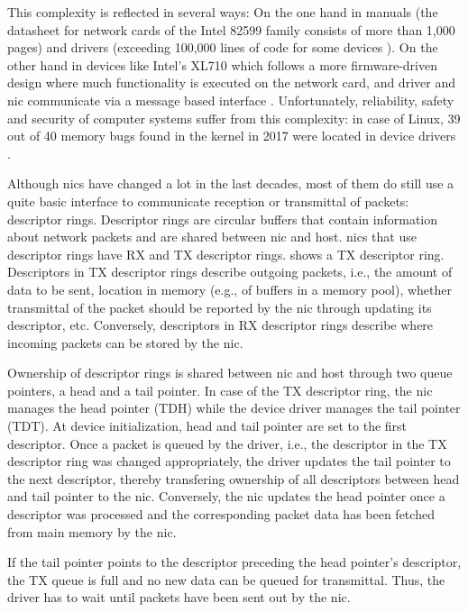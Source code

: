 This complexity is reflected in several ways: On the one hand in manuals (the
datasheet for network cards of the Intel 82599 family \cite{intel2016datasheet}
consists of more than 1,000 pages) and drivers (exceeding 100,000 lines of code
for some devices \cite{emmerich2019case}). On the other hand in devices like
Intel's XL710 which follows a more firmware-driven design where much
functionality is executed on the network card, and driver and \ac{nic}
communicate via a message based interface \cite{emmerich2019user}.
Unfortunately, reliability, safety and security of computer systems suffer from
this complexity: in case of Linux, 39 out of 40 memory bugs found in the kernel
in 2017 were located in device drivers \cite{emmerich2019case}.

Although \acp{nic} have changed a lot in the last decades, most of them do still
use a quite basic interface to communicate reception or transmittal of packets:
descriptor rings. Descriptor rings are circular buffers that contain information
about network packets and are shared between \ac{nic} and host. \acp{nic} that
use descriptor rings have RX and TX descriptor rings.  shows a
TX descriptor ring. Descriptors in TX descriptor rings describe outgoing
packets, i.e., the amount of data to be sent, location in memory (e.g., of
buffers in a memory pool), whether transmittal of the packet should be reported
by the \ac{nic} through updating its descriptor, etc. Conversely, descriptors in
RX descriptor rings describe where incoming packets can be stored by the
\ac{nic}.

Ownership of descriptor rings is shared between \ac{nic} and host through two
queue pointers, a head and a tail pointer. In case of the TX descriptor ring,
the \ac{nic} manages the head pointer (TDH) while the device driver manages the
tail pointer (TDT). At device initialization, head and tail pointer are set to
the first descriptor. Once a packet is queued by the driver, i.e., the
descriptor in the TX descriptor ring was changed appropriately, the driver
updates the tail pointer to the next descriptor, thereby transfering ownership
of all descriptors between head and tail pointer to the \ac{nic}. Conversely,
the \ac{nic} updates the head pointer once a descriptor was processed and the
corresponding packet data has been fetched from main memory by the \ac{nic}.

If the tail pointer points to the descriptor preceding the head pointer's
descriptor, the TX queue is full and no new data can be queued for transmittal.
Thus, the driver has to wait until packets have been sent out by the \ac{nic}.


